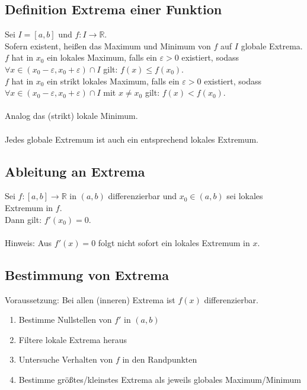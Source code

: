 \documentclass[halfparscip]{scrartcl}
\newcounter{subsection2}
\begin{document}
\subsection{Definition Extrema einer Funktion}
Sei $I = [a,b]$ und $f:I\rightarrow\mathbb{R}$.\\
Sofern existent, heißen das Maximum und Minimum von $f$ auf $I$ globale Extrema.
$f$ hat in $x_0$ ein lokales Maximum, falls ein $\varepsilon > 0$ existiert, sodass $\forall x \in (x_0 - \varepsilon, x_0 + \varepsilon)\cap I$ gilt: $f(x) \leq f(x_0)$.\\
$f$ hat in $x_0$ ein strikt lokales Maximum, falls ein $\varepsilon > 0$ existiert, sodass $\forall x \in (x_0 - \varepsilon, x_0 + \varepsilon)\cap I$ mit $x \neq x_0$ gilt: $f(x) < f(x_0)$.\\\\
Analog das (strikt) lokale Minimum.\\\\
Jedes globale Extremum ist auch ein entsprechend lokales Extremum.

\subsection{Ableitung an Extrema}
Sei $f:[a,b] \rightarrow\mathbb{R}$ in $(a,b)$ differenzierbar und $x_0 \in (a,b)$ sei lokales Extremum in $f$.\\
Dann gilt: $f'(x_0) = 0$.\\\\
Hinweis: Aus $f'(x) = 0$ folgt nicht sofort ein lokales Extremum in $x$.

\subsection*{Bestimmung von Extrema}
Voraussetzung: Bei allen (inneren) Extrema ist $f(x)$ differenzierbar.
\begin{enumerate}
	\item Bestimme Nullstellen von $f'$ in $(a,b)$
	\item Filtere lokale Extrema heraus
	\item Untersuche Verhalten von $f$ in den Randpunkten
	\item Bestimme größtes/kleinstes Extrema als jeweils globales Maximum/Minimum
\end{enumerate}

\addtocounter{subsection}{3}
\end{document}
